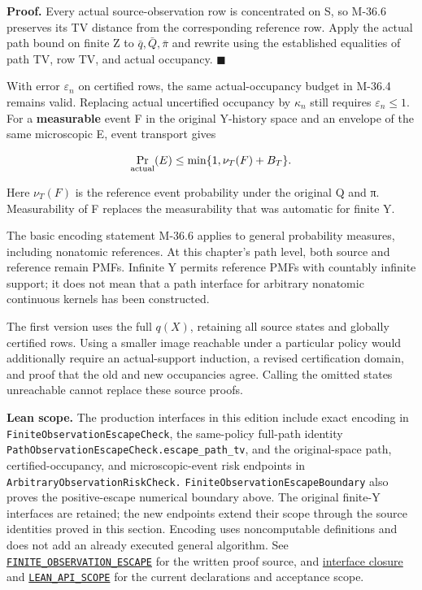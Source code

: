 \documentclass[
  english,
  11pt,
  oneside]{book}
\begin{document}
\textbf{Proof.} Every actual source-observation row is concentrated on S, so M-36.6 preserves its TV distance from the corresponding reference row. Apply the actual path bound on finite Z to \(\bar q,\bar Q,\bar\pi\) and rewrite using the established equalities of path TV, row TV, and actual occupancy. \(\blacksquare\)

With error \(\varepsilon_n\) on certified rows, the same actual-occupancy budget in M-36.4 remains valid. Replacing actual uncertified occupancy by \(\kappa_n\) still requires \(\varepsilon_n\le1\). For a \textbf{measurable} event F in the original Y-history space and an envelope of the same microscopic E, event transport gives

\[\Pr_{\rm actual}(E)\le
\min\{1,\nu_T(F)+B_T\}.\]

Here \(\nu_T(F)\) is the reference event probability under the original Q and π. Measurability of F replaces the measurability that was automatic for finite Y.

The basic encoding statement M-36.6 applies to general probability measures, including nonatomic references. At this chapter's path level, both source and reference remain PMFs. Infinite Y permits reference PMFs with countably infinite support; it does not mean that a path interface for arbitrary nonatomic continuous kernels has been constructed.

The first version uses the full \(q(X)\), retaining all source states and globally certified rows. Using a smaller image reachable under a particular policy would additionally require an actual-support induction, a revised certification domain, and proof that the old and new occupancies agree. Calling the omitted states unreachable cannot replace these source proofs.

\textbf{Lean scope.} The production interfaces in this edition include exact encoding in \nolinkurl{FiniteObservationEscapeCheck}, the same-policy full-path identity \nolinkurl{PathObservationEscapeCheck.escape_path_tv}, and the original-space path, certified-occupancy, and microscopic-event risk endpoints in \nolinkurl{ArbitraryObservationRiskCheck.} \nolinkurl{FiniteObservationEscapeBoundary} also proves the positive-escape numerical boundary above. The original finite-Y interfaces are retained; the new endpoints extend their scope through the source identities proved in this section. Encoding uses noncomputable definitions and does not add an already executed general algorithm. See \href{../formalization/ueot-core/docs/compression/theory_completion/unified_closure/interface_research_v1/FINITE_OBSERVATION_ESCAPE.md}{\nolinkurl{FINITE_OBSERVATION_ESCAPE}} for the written proof source, and \href{../formalization/ueot-core/docs/compression/theory_completion/unified_closure/REGISTERED_INTERFACES_CLOSURE_V1.md}{interface closure} and \href{LEAN_API_SCOPE.md}{\nolinkurl{LEAN_API_SCOPE}} for the current declarations and acceptance scope.
\end{document}
